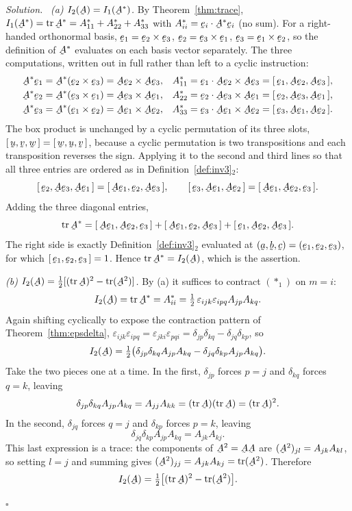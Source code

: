 \documentclass[17pt,a4paper]{extreport}
\DeclareRobustCommand{\vek}[1]{\underaccent{\tilde}{#1}}
\newcommand{\tr}{\operatorname{tr}}
\newcommand{\ba}{\vek{a}}
\newcommand{\bb}{\vek{b}}
\newcommand{\bc}{\vek{c}}
\newcommand{\bu}{\vek{u}}
\newcommand{\bv}{\vek{v}}
\newcommand{\bw}{\vek{w}}
\newcommand{\be}{\vek{e}}
\newcommand{\bA}{\vek{A}}
\newcommand{\dd}{\delta}
\newcommand{\eps}{\varepsilon}
\newcommand{\tbox}[3]{[\,#1,#2,#3\,]}
\newcommand{\ip}[2]{#1\cdot#2}
\theoremstyle{scplain}
\theoremstyle{scdefn}
\theoremstyle{scplain}
\newenvironment{solution}
 {\par\smallskip\noindent\textit{Solution.}\ }
 {\hfill$\square$\par\medskip}
\begin{document}
\begin{solution}
\medskip
\emph{(a) $I_{2}(\bA)=I_{1}(\bA^{*})$.}
By Theorem~\ref{thm:trace}, $I_{1}(\bA^{*})=\tr\bA^{*}=A^{*}_{11}+A^{*}_{22}
+A^{*}_{33}$ with $A^{*}_{ii}=\ip{\be_{i}}{\bA^{*}\be_{i}}$ (no sum). For a
right-handed orthonormal basis,
$\be_{1}=\be_{2}\times\be_{3}$, $\be_{2}=\be_{3}\times\be_{1}$,
$\be_{3}=\be_{1}\times\be_{2}$, so the definition of $\bA^{*}$ evaluates on
each basis vector separately. The three computations, written out in full
rather than left to a cyclic instruction:
\[
\begin{aligned}
   \bA^{*}\be_{1}&=\bA^{*}(\be_{2}\times\be_{3})=\bA\be_{2}\times\bA\be_{3},
   &A^{*}_{11}&=\ip{\be_{1}}{\bA\be_{2}\times\bA\be_{3}}
               =\tbox{\be_{1}}{\bA\be_{2}}{\bA\be_{3}},\\
   \bA^{*}\be_{2}&=\bA^{*}(\be_{3}\times\be_{1})=\bA\be_{3}\times\bA\be_{1},
   &A^{*}_{22}&=\ip{\be_{2}}{\bA\be_{3}\times\bA\be_{1}}
               =\tbox{\be_{2}}{\bA\be_{3}}{\bA\be_{1}},\\
   \bA^{*}\be_{3}&=\bA^{*}(\be_{1}\times\be_{2})=\bA\be_{1}\times\bA\be_{2},
   &A^{*}_{33}&=\ip{\be_{3}}{\bA\be_{1}\times\bA\be_{2}}
               =\tbox{\be_{3}}{\bA\be_{1}}{\bA\be_{2}} .
\end{aligned}
\]
The box product is unchanged by a cyclic permutation of its three slots,
$\tbox\bu\bv\bw=\tbox\bw\bu\bv$, because a cyclic permutation is two
transpositions and each transposition reverses the sign. Applying it to the
second and third lines so that all three entries are ordered as in
Definition~\ref{def:inv3}$_{2}$:
\[
   \tbox{\be_{2}}{\bA\be_{3}}{\bA\be_{1}}
   =\tbox{\bA\be_{1}}{\be_{2}}{\bA\be_{3}},\qquad
   \tbox{\be_{3}}{\bA\be_{1}}{\bA\be_{2}}
   =\tbox{\bA\be_{1}}{\bA\be_{2}}{\be_{3}} .
\]
Adding the three diagonal entries,
\[
   \tr\bA^{*}=\tbox{\bA\be_{1}}{\bA\be_{2}}{\be_{3}}
             +\tbox{\bA\be_{1}}{\be_{2}}{\bA\be_{3}}
             +\tbox{\be_{1}}{\bA\be_{2}}{\bA\be_{3}} .
\]
The right side is exactly Definition~\ref{def:inv3}$_{2}$ evaluated at
$(\ba,\bb,\bc)=(\be_{1},\be_{2},\be_{3})$, for which
$\tbox{\be_{1}}{\be_{2}}{\be_{3}}=1$. Hence $\tr\bA^{*}=I_{2}(\bA)$, which
is the assertion.

\medskip
\emph{(b) $I_{2}(\bA)=\tfrac12[(\tr\bA)^{2}-\tr(\bA^{2})]$.}
By (a) it suffices to contract $(\ast_1)$ on $m=i$:
\[
   I_{2}(\bA)=\tr\bA^{*}=A^{*}_{ii}
   =\tfrac12\,\eps_{ijk}\eps_{ipq}A_{jp}A_{kq}.
\]
Again shifting cyclically to expose the contraction pattern of
Theorem~\ref{thm:epsdelta},
$\eps_{ijk}\eps_{ipq}=\eps_{jki}\eps_{pqi}=\dd_{jp}\dd_{kq}
-\dd_{jq}\dd_{kp}$, so
\[
   I_{2}(\bA)=\tfrac12\big(\dd_{jp}\dd_{kq}A_{jp}A_{kq}
                          -\dd_{jq}\dd_{kp}A_{jp}A_{kq}\big).
\]
Take the two pieces one at a time. In the first, $\dd_{jp}$ forces $p=j$ and
$\dd_{kq}$ forces $q=k$, leaving
\[
   \dd_{jp}\dd_{kq}A_{jp}A_{kq}=A_{jj}A_{kk}=(\tr\bA)(\tr\bA)=(\tr\bA)^{2}.
\]
In the second, $\dd_{jq}$ forces $q=j$ and $\dd_{kp}$ forces $p=k$, leaving
\[
   \dd_{jq}\dd_{kp}A_{jp}A_{kq}=A_{jk}A_{kj}.
\]
This last expression is a trace: the components of $\bA^{2}=\bA\bA$ are
$(\bA^{2})_{jl}=A_{jk}A_{kl}$, so setting $l=j$ and summing gives
$(\bA^{2})_{jj}=A_{jk}A_{kj}=\tr(\bA^{2})$. Therefore
\[
   I_{2}(\bA)=\tfrac12\big[(\tr\bA)^{2}-\tr(\bA^{2})\big].
\]


\end{solution}
\end{document}

